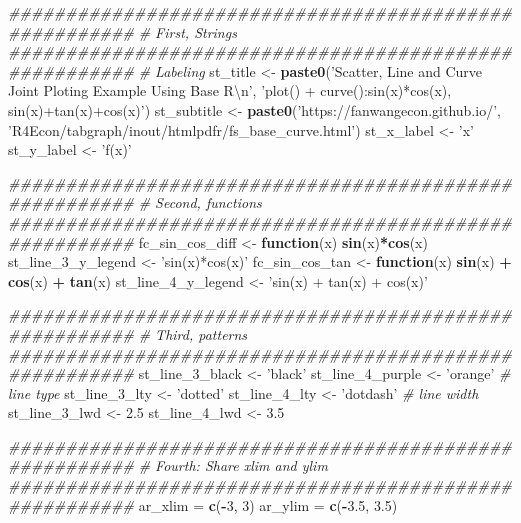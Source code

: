 \documentclass[
]{book}
\newenvironment{Shaded}{\begin{snugshade}}{\end{snugshade}}
\newcommand{\CharTok}[1]{\textcolor[rgb]{0.31,0.60,0.02}{#1}}
\newcommand{\CommentTok}[1]{\textcolor[rgb]{0.56,0.35,0.01}{\textit{#1}}}
\newcommand{\ControlFlowTok}[1]{\textcolor[rgb]{0.13,0.29,0.53}{\textbf{#1}}}
\newcommand{\DecValTok}[1]{\textcolor[rgb]{0.00,0.00,0.81}{#1}}
\newcommand{\FloatTok}[1]{\textcolor[rgb]{0.00,0.00,0.81}{#1}}
\newcommand{\KeywordTok}[1]{\textcolor[rgb]{0.13,0.29,0.53}{\textbf{#1}}}
\newcommand{\NormalTok}[1]{#1}
\newcommand{\OperatorTok}[1]{\textcolor[rgb]{0.81,0.36,0.00}{\textbf{#1}}}
\newcommand{\StringTok}[1]{\textcolor[rgb]{0.31,0.60,0.02}{#1}}
\begin{document}
\begin{Shaded}
\begin{Highlighting}[]
\CommentTok{#######################################################}
\CommentTok{# First, Strings}
\CommentTok{#######################################################}
\CommentTok{# Labeling}
\NormalTok{st_title <-}\StringTok{ }\KeywordTok{paste0}\NormalTok{(}\StringTok{'Scatter, Line and Curve Joint Ploting Example Using Base R}\CharTok{\textbackslash{}n}\StringTok{'}\NormalTok{,}
                   \StringTok{'plot() + curve():sin(x)*cos(x), sin(x)+tan(x)+cos(x)'}\NormalTok{)}
\NormalTok{st_subtitle <-}\StringTok{ }\KeywordTok{paste0}\NormalTok{(}\StringTok{'https://fanwangecon.github.io/'}\NormalTok{,}
                      \StringTok{'R4Econ/tabgraph/inout/htmlpdfr/fs_base_curve.html'}\NormalTok{)}
\NormalTok{st_x_label <-}\StringTok{ 'x'}
\NormalTok{st_y_label <-}\StringTok{ 'f(x)'}

\CommentTok{#######################################################}
\CommentTok{# Second, functions}
\CommentTok{#######################################################}
\NormalTok{fc_sin_cos_diff <-}\StringTok{ }\ControlFlowTok{function}\NormalTok{(x) }\KeywordTok{sin}\NormalTok{(x)}\OperatorTok{*}\KeywordTok{cos}\NormalTok{(x)}
\NormalTok{st_line_}\DecValTok{3}\NormalTok{_y_legend <-}\StringTok{ 'sin(x)*cos(x)'}
\NormalTok{fc_sin_cos_tan <-}\StringTok{ }\ControlFlowTok{function}\NormalTok{(x) }\KeywordTok{sin}\NormalTok{(x) }\OperatorTok{+}\StringTok{ }\KeywordTok{cos}\NormalTok{(x) }\OperatorTok{+}\StringTok{ }\KeywordTok{tan}\NormalTok{(x)}
\NormalTok{st_line_}\DecValTok{4}\NormalTok{_y_legend <-}\StringTok{ 'sin(x) + tan(x) + cos(x)'}

\CommentTok{#######################################################}
\CommentTok{# Third, patterns}
\CommentTok{#######################################################}
\NormalTok{st_line_}\DecValTok{3}\NormalTok{_black <-}\StringTok{ 'black'}
\NormalTok{st_line_}\DecValTok{4}\NormalTok{_purple <-}\StringTok{ 'orange'}
\CommentTok{# line type}
\NormalTok{st_line_}\DecValTok{3}\NormalTok{_lty <-}\StringTok{ 'dotted'}
\NormalTok{st_line_}\DecValTok{4}\NormalTok{_lty <-}\StringTok{ 'dotdash'}
\CommentTok{# line width}
\NormalTok{st_line_}\DecValTok{3}\NormalTok{_lwd <-}\StringTok{ }\FloatTok{2.5}
\NormalTok{st_line_}\DecValTok{4}\NormalTok{_lwd <-}\StringTok{ }\FloatTok{3.5}

\CommentTok{#######################################################}
\CommentTok{# Fourth: Share xlim and ylim}
\CommentTok{#######################################################}
\NormalTok{ar_xlim =}\StringTok{ }\KeywordTok{c}\NormalTok{(}\OperatorTok{-}\DecValTok{3}\NormalTok{, }\DecValTok{3}\NormalTok{)}
\NormalTok{ar_ylim =}\StringTok{ }\KeywordTok{c}\NormalTok{(}\OperatorTok{-}\FloatTok{3.5}\NormalTok{, }\FloatTok{3.5}\NormalTok{)}


\end{Highlighting}
\end{Shaded}
\end{document}
